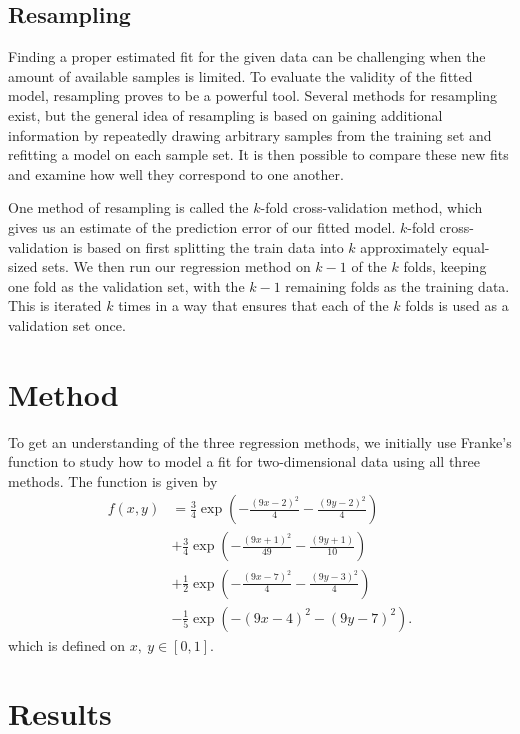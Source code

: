 \documentclass[a4paper, 10pt]{article}
\begin{document}
\begin{multicols}{2}
\subsection{Resampling}
Finding a proper estimated fit for the given data can be challenging when the amount of available samples is limited. To evaluate the validity of the fitted model, resampling proves to be a powerful tool. Several methods for resampling exist, but the general idea of resampling is based on gaining additional information by repeatedly drawing arbitrary samples from the training set and refitting a model on each sample set. It is then possible to compare these new fits and examine how well they correspond to one another.

One method of resampling is called the $k$-fold cross-validation method, which gives us an estimate of the prediction error of our fitted model. $k$-fold cross-validation is based on first splitting the train data into $k$ approximately equal-sized sets.  We then run our regression method on $k-1$ of the $k$ folds, keeping one fold as the validation set, with the $k-1$ remaining folds as the training data. This is iterated $k$ times in a way that ensures that each of the $k$ folds is used as a validation set once. 



\section{Method}
To get an understanding of the three regression methods, we initially use Franke's function to study how to model a fit for two-dimensional data using all three methods. The function is given by 
\begin{align}
f(x,y) &= \frac{3}{4}\exp{\left(-\frac{(9x-2)^2}{4}   - \frac{(9y-2)^2}{4}\right)} \nonumber\\
 &+\frac{3}{4}\exp{\left(-\frac{(9x+1)^2}{49}- \frac{(9y+1)}{10}\right)} \nonumber\\
 &+\frac{1}{2}\exp{\left(-\frac{(9x-7)^2}{4} - \frac{(9y-3)^2}{4}\right)} \nonumber\\
 &-\frac{1}{5}\exp{\left(-(9x-4)^2 - (9y-7)^2\right) }.
\end{align} which is defined on $x,\ y \in [0,1]$. 









\section{Results}

\end{multicols}
\end{document}
